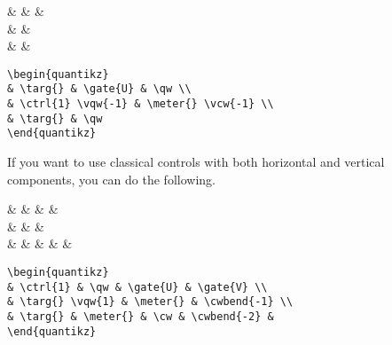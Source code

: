 \documentclass[aps,pra,10pt,nofootinbib]{revtex4}
\begin{document}
\begin{Code}
\begin{center}
\begin{quantikz}
& \targ{} &  & \qw \\
&   & \meter{}  \\
& \targ{} & \qw
\end{quantikz}
\end{center}
\tcblower
\begin{lstlisting}
\begin{quantikz}
& \targ{} & \gate{U} & \qw \\
& \ctrl{1} \vqw{-1} & \meter{} \vcw{-1} \\
& \targ{} & \qw
\end{quantikz}
\end{lstlisting}
\end{Code}
If you want to use classical controls with both horizontal and vertical components, you can do the following.
\begin{Code}
\begin{center}
\begin{quantikz}
&  & \qw &  &  \\
& \targ{}  & \meter{} &   \\
& \targ{} & \meter{} & \cw &  &
\end{quantikz}
\end{center}
\tcblower
\begin{lstlisting}
\begin{quantikz}
& \ctrl{1} & \qw & \gate{U} & \gate{V} \\
& \targ{} \vqw{1} & \meter{} & \cwbend{-1} \\
& \targ{} & \meter{} & \cw & \cwbend{-2} &
\end{quantikz}
\end{lstlisting}
\end{Code}
\end{document}

